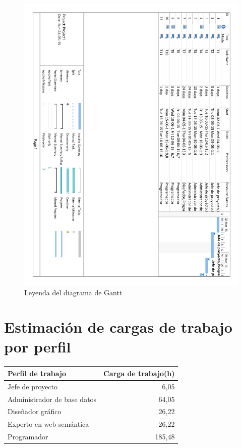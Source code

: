 \begin{figure}[!htp]
	\centering
	\includegraphics[page=4, scale=.7]{fig/real_gantt_diagram}
	\caption{Leyenda del diagrama de Gantt}
\end{figure}

\FloatBarrier

\section{Estimación de cargas de trabajo por perfil}

\begin{center}
	\begin{tabular}{|l|r|}
		\hline
		Perfil de trabajo & Carga de trabajo(h) \\ \hline
		Jefe de proyecto & 6,05 \\ \hline
		Administrador de base datos & 64,05 \\ \hline
		Diseñador gráfico & 26,22 \\ \hline
		Experto en web semántica & 26,22 \\ \hline
		Programador & 185,48 \\
		\hline
	\end{tabular}
\end{center}

